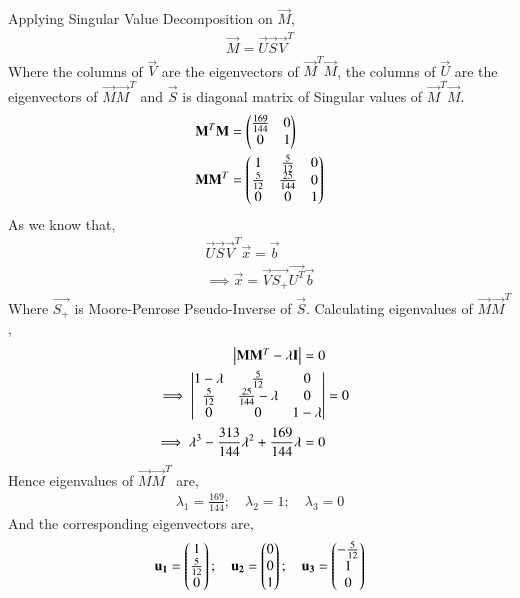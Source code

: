 \documentclass[journal,12pt,twocolumn]{IEEEtran}
\begin{document}
Applying Singular Value Decomposition on $\vec{M}$,
\begin{align} \label{eq:eq_6}
    \vec{M}=\vec{U}\vec{S}\vec{V}^T
\end{align}
Where the columns of $\vec{V}$ are the eigenvectors of $\vec{M}^T\vec{M}$, the columns of $\vec{U}$ are the eigenvectors of $\vec{M}\vec{M}^T$ and $\vec{S}$ is diagonal matrix of Singular values of $\vec{M}^T\vec{M}$.
\begin{align}
    \mathbf{M}^T\mathbf{M} &= \begin{pmatrix}\frac{169}{144} & 0\\0 & 1\end{pmatrix} \\
    \mathbf{M}\mathbf{M}^T &= \begin{pmatrix}1 & \frac{5}{12} & 0\\\frac{5}{12} & \frac{25}{144} & 0\\ 0 & 0 & 1\end{pmatrix} 
\end{align}
As we know that,
\begin{align}
    \vec{U} \vec{S} \vec{V}^T \vec{x} = \vec{b} \nonumber \\
    \implies \vec{x} = \vec{V} \vec{S_+} \vec{U^T} \vec{b} \label{eq:eq_9}
\end{align}
Where $\vec{S_+}$ is Moore-Penrose Pseudo-Inverse of $\vec{S}$. Calculating eigenvalues of $\vec{M}\vec{M}^T$,
\begin{align}
    \begin{vmatrix}\mathbf{M} \mathbf{M}^T - \lambda \mathbf{I}\end{vmatrix} = 0 \nonumber \\
    \implies \begin{vmatrix}1-\lambda & \frac{5}{12} & 0 \\ \frac{5}{12} & \frac{25}{144}-\lambda & 0 \\ 0 & 0 & 1-\lambda\end{vmatrix} &= 0 \nonumber \\
    \implies \lambda^3 - \frac{313}{144}\lambda^2 + \frac{169}{144}\lambda =0 \nonumber
\end{align}
Hence eigenvalues of $\vec{M}\vec{M}^T$ are,
\begin{align} \label{eq:eq_10}
    \lambda_1 = \frac{169}{144}; \quad \lambda_2 = 1; \quad \lambda_3 =0
\end{align}
And the corresponding eigenvectors are,
\begin{align}
    \mathbf{u_1} = \begin{pmatrix}1 \\ \frac{5}{12} \\ 0\end{pmatrix}; \quad \mathbf{u_2} = \begin{pmatrix}0 \\ 0 \\ 1\end{pmatrix}; \quad
    \mathbf{u_3} = \begin{pmatrix}-\frac{5}{12} \\ 1 \\ 0\end{pmatrix} \label{eq:eq_11} 
\end{align}
\end{document}
